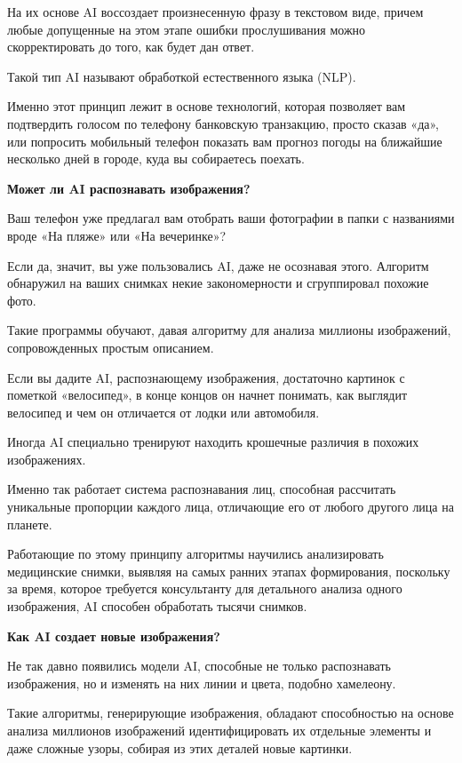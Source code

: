 На их основе AI воссоздает произнесенную фразу в текстовом виде, причем любые допущенные на этом этапе ошибки прослушивания можно скорректировать до того, как будет дан ответ.

Такой тип AI называют обработкой естественного языка (NLP).

Именно этот принцип лежит в основе технологий, которая позволяет вам подтвердить голосом по телефону банковскую транзакцию, просто сказав «да», или попросить мобильный телефон показать вам прогноз погоды на ближайшие несколько дней в городе, куда вы собираетесь поехать.


\textbf{Может ли AI распознавать изображения?}

Ваш телефон уже предлагал вам отобрать ваши фотографии в папки с названиями вроде «На пляже» или «На вечеринке»?

Если да, значит, вы уже пользовались AI, даже не осознавая этого. Алгоритм обнаружил на ваших снимках некие закономерности и сгруппировал похожие фото.

Такие программы обучают, давая алгоритму для анализа миллионы изображений, сопровожденных простым описанием.

Если вы дадите AI, распознающему изображения, достаточно картинок с пометкой «велосипед», в конце концов он начнет понимать, как выглядит велосипед и чем он отличается от лодки или автомобиля.

Иногда AI специально тренируют находить крошечные различия в похожих изображениях.

Именно так работает система распознавания лиц, способная рассчитать уникальные пропорции каждого лица, отличающие его от любого другого лица на планете.

Работающие по этому принципу алгоритмы научились анализировать медицинские снимки, выявляя  на самых ранних этапах формирования, поскольку за время, которое требуется консультанту для детального анализа одного изображения, AI способен обработать тысячи снимков.


\textbf{Как AI создает новые изображения?}

Не так давно появились модели AI, способные не только распознавать изображения, но и изменять на них линии и цвета, подобно хамелеону.

Такие алгоритмы, генерирующие изображения, обладают способностью на основе анализа миллионов изображений идентифицировать их отдельные элементы и даже сложные узоры, собирая из этих деталей новые картинки.

